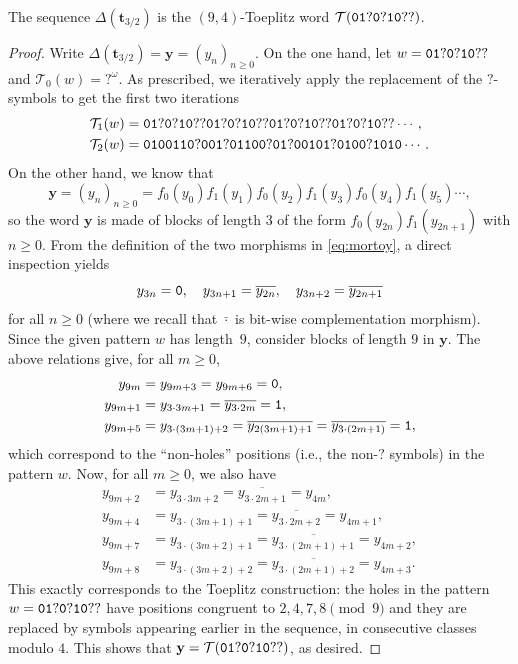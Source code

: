 \documentclass[12pt,reqno]{article}
\newcommand{\que}{\mathord{?}}
\begin{document}
\begin{proposition}\label{pro:ytop}
The sequence $\Delta(\mathbf{t}_{3/2})$ is the $(9,4)$-Toeplitz word $\mathcal{T}({\tt 01}\que{\tt 0}\que{\tt 10}\que\que)$.   
\end{proposition}
\begin{proof}
Write $\Delta(\mathbf{t}_{3/2})=\mathbf{y}=(y_n)_{n\ge 0}$. 
On the one hand,  let $w={\tt 01}\que{\tt 0}\que{\tt 10}\que\que$ and $\mathcal{T}_0(w)=\que^\omega$. 
As prescribed,  we iteratively apply the replacement of the $\que$-symbols to get the first two iterations
\begin{align*}
  \mathcal{T}_1(w)&={\tt 01}\que{\tt 0}\que{\tt 10}\que\que{\tt 01}\que{\tt 0}\que{\tt 10}\que\que{\tt 01}\que{\tt 0}\que{\tt 10}\que\que{\tt 01}\que{\tt 0}\que{\tt 10}\que\que\cdots, \\
  \mathcal{T}_2(w)&={\tt 0100110}\que{\tt 001}\que{\tt 01100}\que{\tt 01}\que{\tt 00101}\que{\tt 0100}\que{\tt 1010}\cdots.
\end{align*}
On the other hand,  we know that
  \[
    \mathbf{y}=(y_n)_{n\ge 0}=f_0(y_0) f_1(y_1) f_0(y_2) f_1(y_3) f_0(y_4) f_1(y_5)\cdots,
  \]
  so the word $\mathbf{y}$ is made of blocks of length $3$ of the form $f_0(y_{2n})f_1(y_{2n+1})$ with $n\ge 0$. From the definition of the two morphisms in \eqref{eq:mortoy}, a direct inspection yields
  \[
    y_{3n}={\tt 0},\quad y_{3n+1}=\overline{y_{2n}},\quad y_{3n+2}=\overline{y_{2n+1}}
  \]
  for all $n\ge 0$ (where we recall that $\bar{\cdot}$ is bit-wise complementation morphism).
  Since the given pattern $w$ has length~$9$, consider blocks of length $9$ in $\mathbf{y}$. The above relations give,  for all $m\ge 0$,
  \begin{align*}
    y_{9m}&=y_{9m+3}=y_{9m+6}={\tt 0},\\
    y_{9m+1}&=y_{3\cdot 3m+1}=\overline{y_{3\cdot 2m}}={\tt 1},\\
    y_{9m+5}&=y_{3 \cdot(3m+1)+2}=\overline{y_{2(3m+1)+1}}=\overline{y_{3 \cdot (2m+1)}}={\tt 1},
  \end{align*}
  which correspond to the ``non-holes'' positions (i.e., the non-$\que$ symbols) in the pattern $w$.  Now,  for all $m\ge 0$,  we also have
  \begin{align*}
    y_{9m+2}&=y_{3\cdot 3m+2}=\overline{y_{3 \cdot2m+1}}=y_{4m},\\
    y_{9m+4}&=y_{3\cdot(3m+1)+1}=\overline{y_{3\cdot2m+2}}=y_{4m+1},\\
    y_{9m+7}&=y_{3\cdot(3m+2)+1}=\overline{y_{3\cdot(2m+1)+1}}=y_{4m+2},\\
    y_{9m+8}&=y_{3\cdot(3m+2)+2}=\overline{y_{3\cdot(2m+1)+2}}=y_{4m+3}.
  \end{align*}
This exactly corresponds to the Toeplitz construction: the holes in the pattern $w={\tt 01}\que{\tt 0}\que{\tt 10}\que\que$ have positions congruent to $2,4,7,8\pmod{9}$ and they are replaced by symbols appearing earlier in the sequence, in consecutive classes modulo $4$.
This shows that $\mathbf{y}=\mathcal{T}({\tt 01}\que{\tt 0}\que{\tt 10}\que\que)$,  as desired.
\end{proof}
\end{document}
